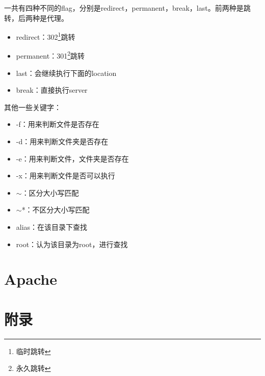 \documentclass[UTF8]{ctexart}
\begin{document}
一共有四种不同的flag，分别是redirect，permanent，break，last。前两种是跳转，后两种是代理。
\begin{itemize}
  \item redirect：302\footnote{临时跳转}跳转
  \item permanent：301\footnote{永久跳转}跳转
  \item last：会继续执行下面的location
  \item break：直接执行server
\end{itemize}

其他一些关键字：
\begin{itemize}
  \item -f：用来判断文件是否存在
  \item -d：用来判断文件夹是否存在
  \item -e：用来判断文件，文件夹是否存在
  \item -x：用来判断文件是否可以执行
  \item $\sim$：区分大小写匹配
  \item $\sim$*：不区分大小写匹配
  \item alias：在该目录下查找
  \item root：认为该目录为root，进行查找
\end{itemize}



\section{Apache}
\clearpage

\section{附录}
\end{document}
